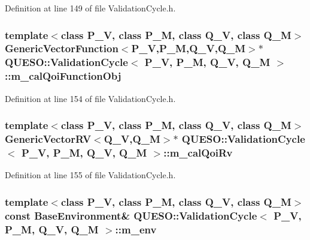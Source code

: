 Definition at line 149 of file Validation\-Cycle.\-h.

\hypertarget{class_q_u_e_s_o_1_1_validation_cycle_ab891acfabc02b5e590deee6e05e30b2c}{
\subsubsection[{m\-\_\-cal\-Qoi\-Function\-Obj}]{\setlength{\rightskip}{0pt plus 5cm}template$<$class P\-\_\-\-V, class P\-\_\-\-M, class Q\-\_\-\-V, class Q\-\_\-\-M$>$ {\bf Generic\-Vector\-Function}$<$P\-\_\-\-V,P\-\_\-\-M,Q\-\_\-\-V,Q\-\_\-\-M$>$$\ast$ {\bf Q\-U\-E\-S\-O\-::\-Validation\-Cycle}$<$ P\-\_\-\-V, P\-\_\-\-M, Q\-\_\-\-V, Q\-\_\-\-M $>$\-::m\-\_\-cal\-Qoi\-Function\-Obj\hspace{0.3cm}{\ttfamily [private]}}}\label{class_q_u_e_s_o_1_1_validation_cycle_ab891acfabc02b5e590deee6e05e30b2c}


Definition at line 154 of file Validation\-Cycle.\-h.

\hypertarget{class_q_u_e_s_o_1_1_validation_cycle_ac3bac139c827b3210e92d4bac190f89f}{
\subsubsection[{m\-\_\-cal\-Qoi\-Rv}]{\setlength{\rightskip}{0pt plus 5cm}template$<$class P\-\_\-\-V, class P\-\_\-\-M, class Q\-\_\-\-V, class Q\-\_\-\-M$>$ {\bf Generic\-Vector\-R\-V}$<$Q\-\_\-\-V,Q\-\_\-\-M$>$$\ast$ {\bf Q\-U\-E\-S\-O\-::\-Validation\-Cycle}$<$ P\-\_\-\-V, P\-\_\-\-M, Q\-\_\-\-V, Q\-\_\-\-M $>$\-::m\-\_\-cal\-Qoi\-Rv\hspace{0.3cm}{\ttfamily [private]}}}\label{class_q_u_e_s_o_1_1_validation_cycle_ac3bac139c827b3210e92d4bac190f89f}


Definition at line 155 of file Validation\-Cycle.\-h.

\hypertarget{class_q_u_e_s_o_1_1_validation_cycle_a38a308718da67cac37c1290d86b93bb3}{
\subsubsection[{m\-\_\-env}]{\setlength{\rightskip}{0pt plus 5cm}template$<$class P\-\_\-\-V, class P\-\_\-\-M, class Q\-\_\-\-V, class Q\-\_\-\-M$>$ const {\bf Base\-Environment}\& {\bf Q\-U\-E\-S\-O\-::\-Validation\-Cycle}$<$ P\-\_\-\-V, P\-\_\-\-M, Q\-\_\-\-V, Q\-\_\-\-M $>$\-::m\-\_\-env\hspace{0.3cm}{\ttfamily [private]}}}\label{class_q_u_e_s_o_1_1_validation_cycle_a38a308718da67cac37c1290d86b93bb3}


